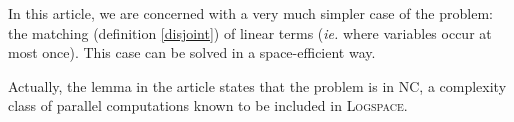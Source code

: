 \medskip
In this article, we are concerned with a very much simpler case of the problem: the matching (definition \ref{disjoint}) of linear terms (\textit{ie.} where variables occur at most once). This case can be solved in a space-efficient way.


Actually, the lemma in the article states that the problem is in \textsc{NC}, a complexity class of parallel computations known to be included in \textsc{Logspace}.

